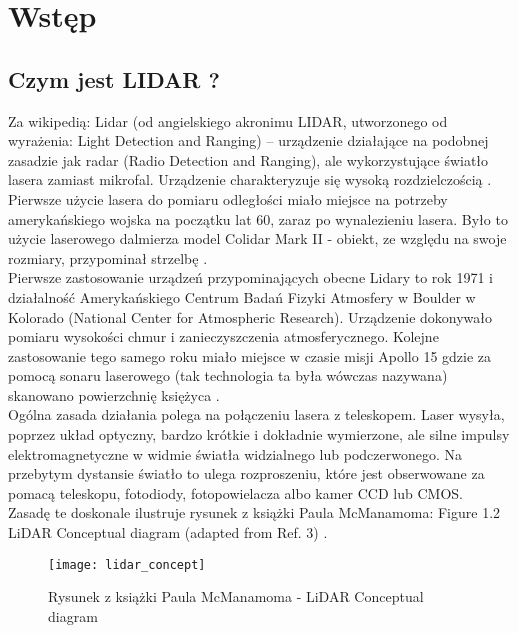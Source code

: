 \section {Wstęp}
\subsection {Czym jest LIDAR ?}

Za wikipedią:
Lidar (od angielskiego akronimu LIDAR, utworzonego od wyrażenia: Light Detection and Ranging)
– urządzenie działające na podobnej zasadzie jak radar (Radio Detection and Ranging), ale
wykorzystujące światło lasera zamiast mikrofal. Urządzenie charakteryzuje się wysoką
rozdzielczością \cite{lidar_pl}.\\

Pierwsze użycie lasera do pomiaru odległości miało miejsce na potrzeby amerykańskiego 
wojska na początku lat 60, zaraz po wynalezieniu lasera. Było to użycie laserowego dalmierza 
model Colidar Mark II - obiekt, ze względu na swoje rozmiary, przypominał strzelbę \cite{lidar_en}.\\

Pierwsze zastosowanie urządzeń przypominających obecne Lidary to rok 1971 i działalność
Amerykańskiego Centrum Badań Fizyki Atmosfery w Boulder w Kolorado (National Center for
Atmospheric Research). Urządzenie dokonywało pomiaru wysokości chmur i zanieczyszczenia
atmosferycznego. Kolejne zastosowanie tego samego roku miało miejsce w czasie misji
Apollo 15 gdzie za pomocą sonaru laserowego (tak technologia ta była wówczas nazywana)
skanowano powierzchnię księżyca \cite{lidar_en}.\\

Ogólna zasada działania polega na połączeniu lasera z teleskopem. Laser wysyła, poprzez układ optyczny, bardzo krótkie i dokładnie wymierzone, ale silne impulsy elektromagnetyczne w widmie światła widzialnego lub podczerwonego. Na przebytym dystansie światło to ulega rozproszeniu, które jest obserwowane za pomacą teleskopu, fotodiody, fotopowielacza albo kamer CCD lub CMOS. \\

Zasadę te doskonale ilustruje rysunek z książki Paula McManamoma:
Figure 1.2 LiDAR Conceptual diagram (adapted from Ref. 3) \cite{mcmanamom}.\\
\begin{figure}[h]
    \centering
    \texttt{[image: lidar\_concept]}
    \caption{Rysunek z książki Paula McManamoma - LiDAR Conceptual diagram}
    \label{fig:lidar_concept}
\end{figure}

